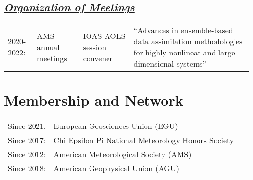 \documentclass{article}
\newcommand{\cvsection}[1]{\section*{\bfseries#1}}
\newcommand{\cvsubsection}[1]{\subsection*{\itshape\uline{#1}}}
\begin{document}
\cvsubsection{Organization of Meetings}
\begin{tabular}{l p{4cm} p{3cm} p{6cm}}
    2020-2022: & AMS annual meetings & IOAS-AOLS session convener & ``Advances in ensemble-based data assimilation methodologies for highly nonlinear and large-dimensional systems'' \\
\end{tabular}

\cvsection{Membership and Network}
\begin{tabular}{l l}
    Since 2021: & European Geosciences Union (EGU) \\
    Since 2017: & Chi Epsilon Pi National Meteorology Honors Society \\
    Since 2012: & American Meteorological Society (AMS) \\
    Since 2018: & American Geophysical Union (AGU) \\
\end{tabular}
\end{document}
